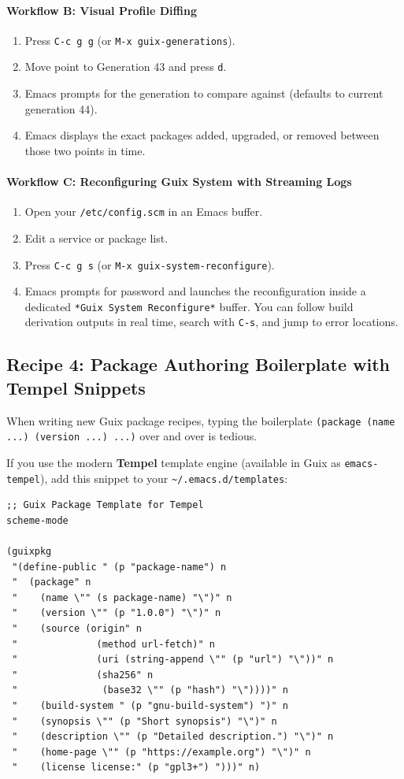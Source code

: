 \paragraph{Workflow B: Visual Profile Diffing}
\begin{enumerate}
  \item Press \texttt{C-c g g} (or \texttt{M-x guix-generations}).
  \item Move point to Generation 43 and press \texttt{d}.
  \item Emacs prompts for the generation to compare against (defaults to current generation 44).
  \item Emacs displays the exact packages added, upgraded, or removed between those two points in time.
\end{enumerate}

\paragraph{Workflow C: Reconfiguring Guix System with Streaming Logs}
\begin{enumerate}
  \item Open your \texttt{/etc/config.scm} in an Emacs buffer.
  \item Edit a service or package list.
  \item Press \texttt{C-c g s} (or \texttt{M-x guix-system-reconfigure}).
  \item Emacs prompts for password and launches the reconfiguration inside a dedicated \texttt{*Guix System Reconfigure*} buffer. You can follow build derivation outputs in real time, search with \texttt{C-s}, and jump to error locations.
\end{enumerate}

\subsection{Recipe 4: Package Authoring Boilerplate with Tempel Snippets}

When writing new Guix package recipes, typing the boilerplate \texttt{(package (name ...) (version ...) ...)} over and over is tedious. 

If you use the modern \textbf{Tempel} template engine (available in Guix as \texttt{emacs-tempel}), add this snippet to your \texttt{\textasciitilde/.emacs.d/templates}:

\begin{lstlisting}[style=guixscheme]
;; Guix Package Template for Tempel
scheme-mode

(guixpkg
 "(define-public " (p "package-name") n
 "  (package" n
 "    (name \"" (s package-name) "\")" n
 "    (version \"" (p "1.0.0") "\")" n
 "    (source (origin" n
 "              (method url-fetch)" n
 "              (uri (string-append \"" (p "url") "\"))" n
 "              (sha256" n
 "               (base32 \"" (p "hash") "\"))))" n
 "    (build-system " (p "gnu-build-system") ")" n
 "    (synopsis \"" (p "Short synopsis") "\")" n
 "    (description \"" (p "Detailed description.") "\")" n
 "    (home-page \"" (p "https://example.org") "\")" n
 "    (license license:" (p "gpl3+") ")))" n)
\end{lstlisting}

